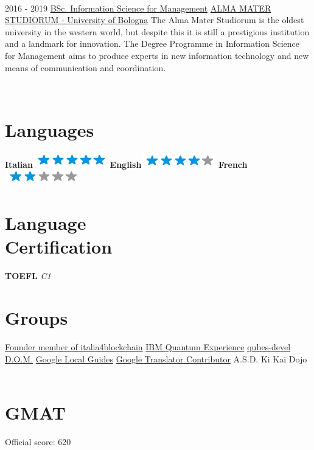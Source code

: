 \documentclass[]{friggeri-cv}
\begin{document}
\begin{entrylist}
{    \\}
    \entry
    {2016 - 2019}
    {\href{http://www.unibo.it/en/teaching/degree-programmes/programme/2016/8014}{BSc. Information Science for Management}}
    {\href{http://www.unibo.it/en/homepage}{ALMA MATER STUDIORUM - University of Bologna}}
    {The Alma Mater Studiorum is the oldest university in the western world, but despite this it is still a prestigious institution and a landmark for innovation. The Degree Programme in Information Science for Management aims to produce experts in new information technology and new means of communication and coordination. \\}
   
    
    \end{entrylist}
    
    \newpage
    
    



\begin{aside}
~
~
~
  \section{Languages}
    \textbf{Italian}\includegraphics[scale=0.40]{img/5stars.png}
    \textbf{English}\includegraphics[scale=0.40]{img/4stars.png}
    \textbf{French}\includegraphics[scale=0.40]{img/2stars.png}
    ~
    \section{Language \\ Certification}
    \textbf{TOEFL} \emph{C1}
    \section{Groups}
    \href{https://www.italia4blockchain.it/}{Founder member of italia4blockchain}
    \href{https://quantumexperience.ng.bluemix.net/qstage/#/community}{IBM Quantum Experience}
    \href{https://groups.google.com/forum/#!forum/qubes-devel}{qubes-devel}
    \href{http://www.liceodavinci.tv/sitoLiceo/index.php/offerta-formativa/progetti/126-gruppo-di-informatica-d-o-m}{D.O.M.}
    \href{https://www.google.com/maps/contrib/100973650799154081103/reviews}{Google Local Guides} 
    \href{https://translate.google.com/community}{Google Translator Contributor}
    {A.S.D. Ki Kai Dojo}
    ~
    \section{GMAT}
    {Official score: 620}
    ~
\end{aside}
\end{document}
